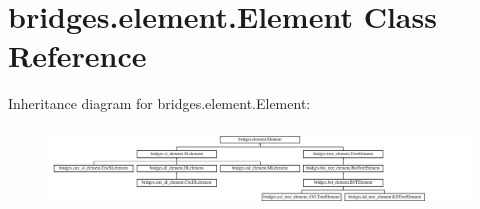 \hypertarget{classbridges_1_1element_1_1_element}{}\section{bridges.\+element.\+Element Class Reference}
\label{classbridges_1_1element_1_1_element}
Inheritance diagram for bridges.\+element.\+Element\+:\begin{figure}[H]
\begin{center}
\leavevmode
\includegraphics[height=2.145594cm]{classbridges_1_1element_1_1_element}
\end{center}
\end{figure}
